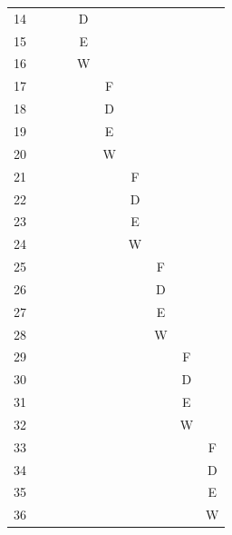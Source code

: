 \begin{table}
{{\begin{tabular}{rccccccccc}
                14 &   &   &   & D &   &   &   &   &   \\
                15 &   &   &   & E &   &   &   &   &   \\ \rowcolor[gray]{.975}
                16 &   &   &   & W &   &   &   &   &   \\
                17 &   &   &   &   & F &   &   &   &   \\ \rowcolor[gray]{.975}
                18 &   &   &   &   & D &   &   &   &   \\
                19 &   &   &   &   & E &   &   &   &   \\ \rowcolor[gray]{.975}
                20 &   &   &   &   & W &   &   &   &   \\
                21 &   &   &   &   &   & F &   &   &   \\ \rowcolor[gray]{.975}
                22 &   &   &   &   &   & D &   &   &   \\
                23 &   &   &   &   &   & E &   &   &   \\ \rowcolor[gray]{.975}
                24 &   &   &   &   &   & W &   &   &   \\
                25 &   &   &   &   &   &   & F &   &   \\ \rowcolor[gray]{.975}
                26 &   &   &   &   &   &   & D &   &   \\
                27 &   &   &   &   &   &   & E &   &   \\ \rowcolor[gray]{.975}
                28 &   &   &   &   &   &   & W &   &   \\
                29 &   &   &   &   &   &   &   & F &   \\ \rowcolor[gray]{.975}
                30 &   &   &   &   &   &   &   & D &   \\
                31 &   &   &   &   &   &   &   & E &   \\ \rowcolor[gray]{.975}
                32 &   &   &   &   &   &   &   & W &   \\
                33 &   &   &   &   &   &   &   &   & F \\ \rowcolor[gray]{.975}
                34 &   &   &   &   &   &   &   &   & D \\
                35 &   &   &   &   &   &   &   &   & E \\ \rowcolor[gray]{.975}
                36 &   &   &   &   &   &   &   &   & W \\
                \bottomrule
            \end{tabular}
            \vfill
}}
\end{table}
